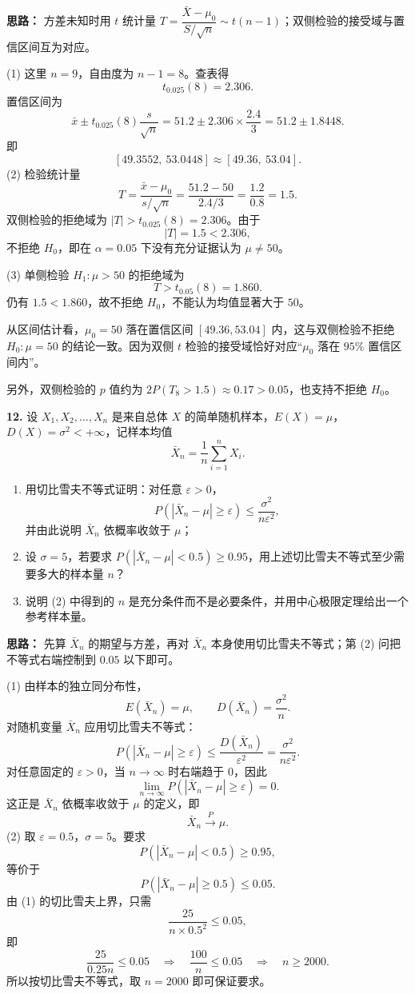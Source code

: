 \ifshowsolutions%
\textbf{思路：} 方差未知时用 $t$ 统计量 $T=\dfrac{\bar X-\mu_0}{S/\sqrt n}\sim t(n-1)$；双侧检验的接受域与置信区间互为对应。

(1) 这里 $n=9$，自由度为 $n-1=8$。查表得
\[
t_{0.025}(8)=2.306.
\]
置信区间为
\[
\bar x\pm t_{0.025}(8)\frac{s}{\sqrt n}
=51.2\pm2.306\times\frac{2.4}{3}
=51.2\pm1.8448.
\]
即
\[
[49.3552,\ 53.0448]\approx[49.36,\ 53.04].
\]
(2) 检验统计量
\[
T=\frac{\bar x-\mu_0}{s/\sqrt n}
=\frac{51.2-50}{2.4/3}
=\frac{1.2}{0.8}=1.5.
\]
双侧检验的拒绝域为 $|T|>t_{0.025}(8)=2.306$。由于
\[
|T|=1.5<2.306,
\]
不拒绝 $H_0$，即在 $\alpha=0.05$ 下没有充分证据认为 $\mu\neq50$。

(3) 单侧检验 $H_1:\mu>50$ 的拒绝域为
\[
T>t_{0.05}(8)=1.860.
\]
仍有 $1.5<1.860$，故不拒绝 $H_0$，不能认为均值显著大于 $50$。

从区间估计看，$\mu_0=50$ 落在置信区间 $[49.36,53.04]$ 内，这与双侧检验不拒绝 $H_0:\mu=50$ 的结论一致。因为双侧 $t$ 检验的接受域恰好对应“$\mu_0$ 落在 $95\%$ 置信区间内”。

另外，双侧检验的 $p$ 值约为 $2P(T_8>1.5)\approx0.17>0.05$，也支持不拒绝 $H_0$。


\else \answerarea[10] \fi%

\textbf{12.} 设 $X_1,X_2,\ldots,X_n$ 是来自总体 $X$ 的简单随机样本，$E(X)=\mu$，$D(X)=\sigma^2<+\infty$，记样本均值
\[
\bar X_n=\frac1n\sum_{i=1}^{n}X_i.
\]
\begin{enumerate}
    \item[(1)] 用切比雪夫不等式证明：对任意 $\varepsilon>0$，
\[
P(|\bar X_n-\mu|\geq\varepsilon)\leq\frac{\sigma^2}{n\varepsilon^2},
\]
并由此说明 $\bar X_n$ 依概率收敛于 $\mu$；
    \item[(2)] 设 $\sigma=5$，若要求 $P(|\bar X_n-\mu|<0.5)\geq0.95$，用上述切比雪夫不等式至少需要多大的样本量 $n$？
    \item[(3)] 说明 (2) 中得到的 $n$ 是充分条件而不是必要条件，并用中心极限定理给出一个参考样本量。
\end{enumerate}

\ifshowsolutions%
\textbf{思路：} 先算 $\bar X_n$ 的期望与方差，再对 $\bar X_n$ 本身使用切比雪夫不等式；第 (2) 问把不等式右端控制到 $0.05$ 以下即可。

(1) 由样本的独立同分布性，
\[
E(\bar X_n)=\mu,\qquad D(\bar X_n)=\frac{\sigma^2}{n}.
\]
对随机变量 $\bar X_n$ 应用切比雪夫不等式：
\[
P(|\bar X_n-\mu|\geq\varepsilon)
\leq\frac{D(\bar X_n)}{\varepsilon^2}
=\frac{\sigma^2}{n\varepsilon^2}.
\]
对任意固定的 $\varepsilon>0$，当 $n\to\infty$ 时右端趋于 $0$，因此
\[
\lim_{n\to\infty}P(|\bar X_n-\mu|\geq\varepsilon)=0.
\]
这正是 $\bar X_n$ 依概率收敛于 $\mu$ 的定义，即
\[
\bar X_n\xrightarrow{P}\mu.
\]
(2) 取 $\varepsilon=0.5$，$\sigma=5$。要求
\[
P(|\bar X_n-\mu|<0.5)\geq0.95,
\]
等价于
\[
P(|\bar X_n-\mu|\geq0.5)\leq0.05.
\]
由 (1) 的切比雪夫上界，只需
\[
\frac{25}{n\times0.5^2}\leq0.05,
\]
即
\[
\frac{25}{0.25n}\leq0.05
\quad\Longrightarrow\quad
\frac{100}{n}\leq0.05
\quad\Longrightarrow\quad
n\geq2000.
\]
所以按切比雪夫不等式，取 $n=2000$ 即可保证要求。

